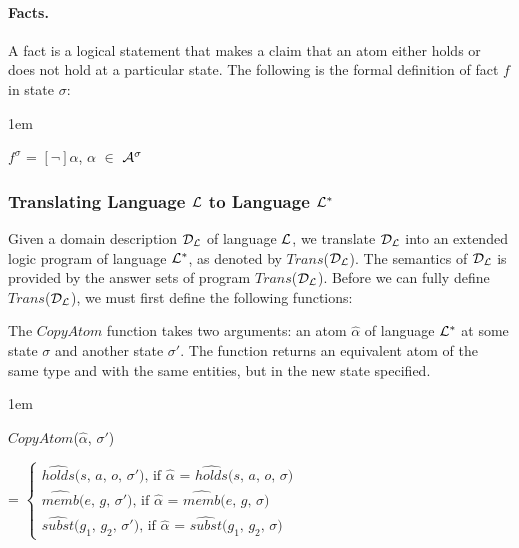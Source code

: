 \documentclass[11pt, twocolumn]{article}
\newenvironment{vquote}
  {\begin{list}{}{\leftmargin 1em}\item[]}
  {\end{list}}
\begin{document}
        \paragraph{Facts.}

          A fact is a logical statement that makes a claim that an atom either
          holds or does not hold at a particular state. The following is the
          formal definition of fact $f$ in state $\sigma$:

          \begin{vquote}
            $f^{\sigma}$ = $[\lnot]$$\alpha$, $\alpha$ $\in$ ${\cal A}^{\sigma}$
          \end{vquote}

      \subsubsection{Translating Language ${\cal L}$ to Language ${\cal L^{*}}$}

        Given a domain description ${\cal D_{L}}$ of language ${\cal L}$, we
        translate ${\cal D_{L}}$ into an extended logic program of language
        ${\cal L^{*}}$, as denoted by $Trans$(${\cal D_{L}}$). The semantics of
        ${\cal D_{L}}$ is provided by the answer sets of program
        $Trans$(${\cal D_{L}}$). Before we can fully define
        $Trans$(${\cal D}_{\cal L}$), we must first define the following
        functions:

        The $CopyAtom$ function takes two arguments: an atom $\hat{\alpha}$
        of language ${\cal L}^{*}$ at some state $\sigma$ and another state
        $\sigma'$. The function returns an equivalent atom of the same type
        and with the same entities, but in the new state specified.

        \begin{vquote}
          $CopyAtom$($\hat{\alpha}$, $\sigma'$)

          =
          \begin{math}
            \begin{cases}
              \mbox{$\hat{holds}$($s$, $a$, $o$, $\sigma'$), if $\hat{\alpha}$ = $\hat{holds}$($s$, $a$, $o$, $\sigma$)} \\
              \mbox{$\hat{memb}$($e$, $g$, $\sigma'$), if $\hat{\alpha}$ = $\hat{memb}$($e$, $g$, $\sigma$)} \\
              \mbox{$\hat{subst}$($g_{1}$, $g_{2}$, $\sigma'$), if $\hat{\alpha}$ = $\hat{subst}$($g_{1}$, $g_{2}$, $\sigma$)}
            \end{cases}
          \end{math}
        \end{vquote}
\end{document}
